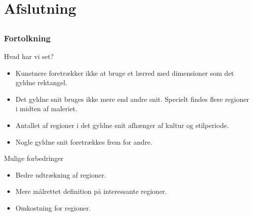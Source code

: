 \documentclass[xcolor=table]{beamer}
\begin{document}
\section{Afslutning}
\subsection*{}
\begin{frame}

    \frametitle{Fortolkning}

    \begin{block}{Hvad har vi set?}
        \begin{itemize}
            \item Kunstnere foretrækker ikke at bruge et lærred med dimensioner som det gyldne rektangel.
            \item Det gyldne snit bruges ikke mere end andre snit. Specielt findes flere regioner i midten af maleriet.
            \item Antallet af regioner i det gyldne snit afhænger af kultur og stilperiode.
            \item Nogle gyldne snit foretrækkes frem for andre.
        \end{itemize}
    \end{block}

    \begin{block}{Mulige forbedringer}
        \begin{itemize}
            \item Bedre udtrækning af regioner.
            \item Mere målrettet definition på interessante regioner.
            \item Omkostning for regioner.
        \end{itemize}
    \end{block}

\end{frame}
\end{document}
